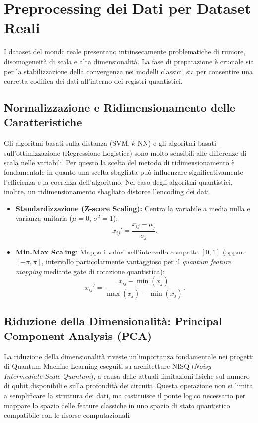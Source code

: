 \section{Preprocessing dei Dati per Dataset Reali}
I dataset del mondo reale presentano intrinsecamente problematiche di rumore, disomogeneità di scala e alta dimensionalità. La fase di preparazione è cruciale sia per la stabilizzazione della convergenza nei modelli classici, sia per consentire una corretta codifica dei dati all'interno dei registri quantistici.

\subsection{Normalizzazione e Ridimensionamento delle Caratteristiche}

Gli algoritmi basati sulla distanza (SVM, $k$-NN) e gli algoritmi basati sull'ottimizzazione (Regressione Logistica) sono molto sensibili alle differenze di scala nelle variabili. Per questo la scelta del metodo di ridimensionamento è fondamentale in quanto una scelta sbagliata può influenzare significativamente l'efficienza e la coerenza dell'algoritmo.
Nel caso degli algoritmi quantistici, inoltre, un ridimensionamento sbagliato distorce l'encoding dei dati.

\begin{itemize}
    \item \textbf{Standardizzazione (Z-score Scaling):} Centra la variabile a media nulla e varianza unitaria ($\mu = 0$, $\sigma^2 = 1$):
    \begin{equation}
    x_{ij}' = \frac{x_{ij} - \mu_j}{\sigma_j}.
    \end{equation}
    \item \textbf{Min-Max Scaling:} Mappa i valori nell'intervallo compatto $[0, 1]$ (oppure $[-\pi, \pi]$, intervallo particolarmente vantaggioso per il \textit{quantum feature mapping} mediante gate di rotazione quantistica):
    \begin{equation}
    x_{ij}' = \frac{x_{ij} - \min(x_j)}{\max(x_j) - \min(x_j)}.
    \end{equation}
\end{itemize}

\subsection{Riduzione della Dimensionalità: Principal Component Analysis (PCA)}
La riduzione della dimensionalità riveste un'importanza fondamentale nei progetti di Quantum Machine Learning eseguiti su architetture NISQ (\textit{Noisy Intermediate-Scale Quantum}), a causa delle attuali limitazioni fisiche sul numero di qubit disponibili e sulla profondità dei circuiti. Questa operazione non si limita a semplificare la struttura dei dati, ma costituisce il ponte logico necessario per mappare lo spazio delle feature classiche in uno spazio di stato quantistico compatibile con le risorse computazionali.

